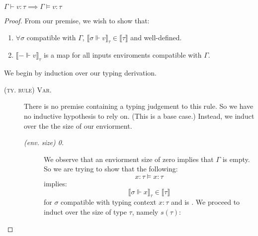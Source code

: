 \begin{theorem}
$\Gamma \vdash v : \tau \implies \Gamma \vDash v : \tau$
\end{theorem}
\begin{proof}
From our premise, we wish to show that:
  \begin{enumerate}
    \item $\forall \sigma$ compatible with $\Gamma$, $\llbracket \sigma \Vdash v
      \rrbracket_{\tau} \in \llbracket \tau \rrbracket$ and well-defined.
    \item $\llbracket - \Vdash v \rrbracket_{\tau}$ is a  map
      for all inputs enviroments compatible with $\Gamma$.
  \end{enumerate}
We begin by induction over our typing derivation. 
\begin{description}
  \item[\textsc{(ty. rule) Var.}] There is no premise containing a typing
    judgement to this rule. So we have no inductive hypothesis to rely on.
    (This is a base case.)
    Instead, we induct over the the size of our enviorment.
    \begin{description}
      \item[\textit{(env. size) 0.}] We observe that an enviorment size of zero
        implies that $\Gamma$ is empty. So we are trying to show that the
        following:
        $$x : \tau \vDash x : \tau$$
        implies:
        $$\llbracket \sigma \Vdash x \rrbracket_\tau \in \llbracket \tau
        \rrbracket$$
        for $\sigma$ compatible with typing context $x : \tau$ and is
        . We proceed to induct over the size of type $\tau$,
        namely $s(\tau)$:
\end{description}
\end{description}
\end{proof}
